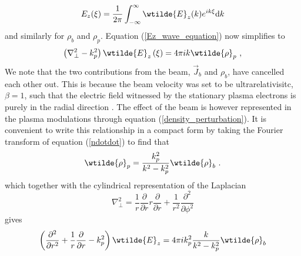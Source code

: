 \begin{equation}
E_z(\xi)=\frac{1}{2\pi}\int_ {-\infty}^{\infty}\wtilde{E}_z(k)e^{ik\xi}\mathrm{d}k
\end{equation}
and similarly for $\rho_b$ and $\rho_p$. Equation (\ref{Ez_wave_equation}) now simplifies to
\begin{equation}
\left(\nabla^2_{\perp}-k^2_p\right)\wtilde{E}_z\left(\xi\right)=4\pi i k\wtilde{\rho}_p~,
\end{equation}
We note that the two contributions from the beam, $\vec{J}_b$ and $\rho_b$, have cancelled each other out. This is because the beam velocity was set to be ultrarelativisitc, $\beta=1$, such that the electric field witnessed by the stationary plasma electrons is purely in the radial direction \citep{Gessner2016}. The effect of the beam is however represented in the plasma modulations through equation (\ref{density_perturbation}). It is convenient to write this relationship in a compact form by taking the Fourier transform of equation (\ref{ndotdot}) to find that
\begin{equation}
\wtilde{\rho}_p=\frac{k_p^2}{k^2-k_p^2}\wtilde{\rho}_b~.
\end{equation}
which together with the cylindrical representation of the Laplacian
\begin{equation}
\nabla_{\perp}^2=\frac{1}{r}\frac{\partial }{\partial r}r\frac{\partial }{\partial r} +\frac{1}{r^2}\frac{\partial^2 }{\partial \phi^2} 
\end{equation}
gives
\begin{equation}
 \left(\frac{\partial^2 }{\partial r^2}+\frac{1}{r}\frac{\partial }{\partial r} -k^2_p\right)\wtilde{E}_z
=4\pi ik_p^2 \frac{k}{k^2-k_p^2}\wtilde{\rho}_b
\label{diffeq_in_transformspace}
\end{equation}
